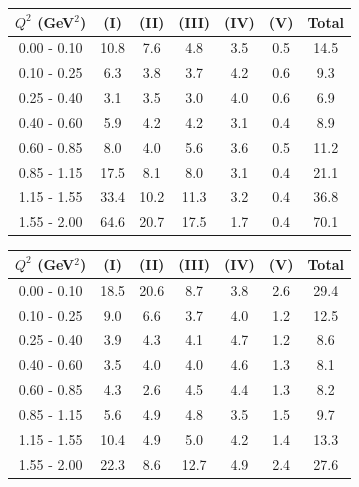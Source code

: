\documentclass[aps, prd, reprint,showpacs,  preprintnumbers,amsmath,amssymb,superscriptaddress, nofootinbib]{revtex4-1}
\makeatletter
\renewenvironment{table}
  {\def\@captype{table}}
  {}
\makeatother
\begin{document}
\vspace{0.4cm}



\begin{table}
\centering
\begin{tabular}{ccccccc}
\hline
$Q^{2}$ (GeV$^{2}$) & (I) & (II) & (III) & (IV) & (V) & Total \\
\hline
   0.00 - 0.10 & 10.8 &  7.6 &  4.8 &  3.5 &  0.5 & 14.5 \\
   0.10 - 0.25 &  6.3 &  3.8 &  3.7 &  4.2 &  0.6 &  9.3 \\
   0.25 - 0.40 &  3.1 &  3.5 &  3.0 &  4.0 &  0.6 &  6.9 \\
   0.40 - 0.60 &  5.9 &  4.2 &  4.2 &  3.1 &  0.4 &  8.9 \\
   0.60 - 0.85 &  8.0 &  4.0 &  5.6 &  3.6 &  0.5 & 11.2 \\
   0.85 - 1.15 & 17.5 &  8.1 &  8.0 &  3.1 &  0.4 & 21.1 \\
   1.15 - 1.55 & 33.4 & 10.2 & 11.3 &  3.2 &  0.4 & 36.8 \\
   1.55 - 2.00 & 64.6 & 20.7 & 17.5 &  1.7 &  0.4 & 70.1 \\
\hline\hline
\end{tabular}
\caption{Fractional systematic uncertainties (in percent) for $d\sigma/dQ^2$ with the selection $1.5 < E_{\nu} < 4.0$\,GeV.}
\label{tb:syst-Q2}
\end{table}

\vspace{0.4cm}


\begin{table}
\centering
\begin{tabular}{ccccccc}
\hline
$Q^{2}$ (GeV$^{2}$) & (I) & (II) & (III) & (IV) & (V) & Total \\
\hline
   0.00 - 0.10 & 18.5 & 20.6 &  8.7 &  3.8 &  2.6 & 29.4 \\
   0.10 - 0.25 &  9.0 &  6.6 &  3.7 &  4.0 &  1.2 & 12.5 \\
   0.25 - 0.40 &  3.9 &  4.3 &  4.1 &  4.7 &  1.2 &  8.6 \\
   0.40 - 0.60 &  3.5 &  4.0 &  4.0 &  4.6 &  1.3 &  8.1 \\
   0.60 - 0.85 &  4.3 &  2.6 &  4.5 &  4.4 &  1.3 &  8.2 \\
   0.85 - 1.15 &  5.6 &  4.9 &  4.8 &  3.5 &  1.5 &  9.7 \\
   1.15 - 1.55 & 10.4 &  4.9 &  5.0 &  4.2 &  1.4 & 13.3 \\
   1.55 - 2.00 & 22.3 &  8.6 & 12.7 &  4.9 &  2.4 & 27.6 \\
\hline\hline
\end{tabular}
\caption{Fractional systematic uncertainties (in percent) for $d\sigma/dQ^2$ with the selection $4.0 < E_{\nu} < 10.0$\,GeV.}
\label{tb:syst-Q2}
\end{table}
\end{document}

